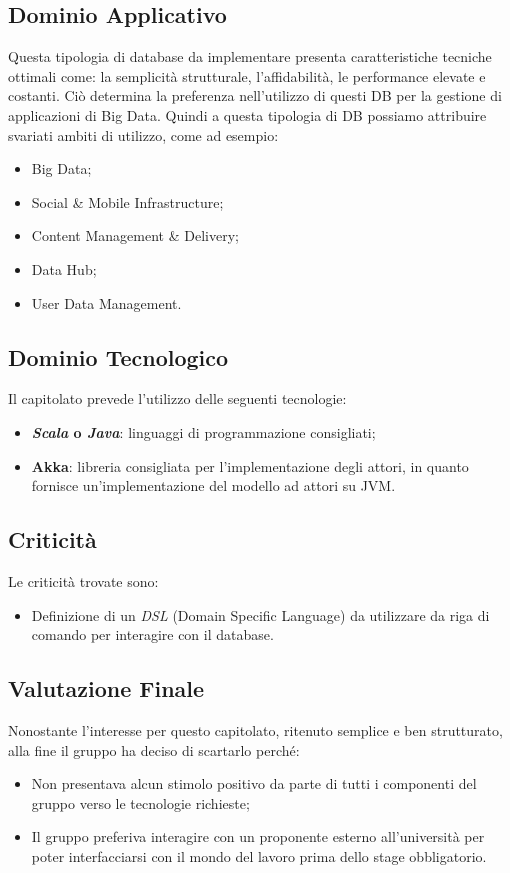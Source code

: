\subsection{Dominio Applicativo}
Questa tipologia di database da implementare presenta caratteristiche tecniche ottimali come: la semplicità strutturale, l'affidabilità, le performance elevate e costanti.
Ciò determina la preferenza nell'utilizzo di questi DB per la gestione di applicazioni di Big Data.
Quindi a questa tipologia di DB possiamo attribuire svariati ambiti di utilizzo, come ad esempio:
\begin{itemize}
\item Big Data; 
\item Social \& Mobile Infrastructure;
\item Content Management \& Delivery;
\item Data Hub;
\item User Data Management. 
\end{itemize}

\subsection{Dominio Tecnologico}
Il capitolato prevede l'utilizzo delle seguenti tecnologie: 
\begin{itemize}
\item \textbf{\textit{Scala} o \textit{Java}}: linguaggi di programmazione consigliati;
\item \textbf{Akka}: libreria consigliata per l'implementazione degli attori, in quanto fornisce un'implementazione del modello ad attori su JVM.
\end{itemize}

\subsection{Criticità}
Le criticità trovate sono:
\begin{itemize}
\item Definizione di un \textit{DSL} (Domain Specific Language) da utilizzare da riga di comando per interagire con il database.
\end{itemize}

\subsection{Valutazione Finale}
Nonostante l'interesse per questo capitolato, ritenuto semplice e ben strutturato, alla fine il gruppo ha deciso di scartarlo perché:
\begin{itemize}
\item Non presentava alcun stimolo positivo da parte di tutti i componenti del gruppo verso le tecnologie richieste;
\item Il gruppo preferiva interagire con un proponente esterno all'università per poter interfacciarsi con il mondo del lavoro prima dello stage obbligatorio.
\end{itemize}
